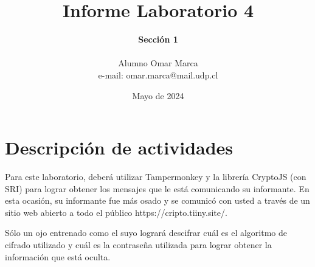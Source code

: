 \documentclass[letter,12pt]{article}
\begin{document}
%
   \title{\Huge{Informe Laboratorio 4}}

   \author{\textbf{Sección 1} \\  \\Alumno Omar Marca \\ e-mail: omar.marca@mail.udp.cl}
          
   \date{Mayo de 2024}

   \maketitle
   
   \tableofcontents
 
  \newpage
  

\section{Descripción de actividades}
Para este laboratorio, deberá utilizar Tampermonkey y la librería CryptoJS (con SRI) para lograr obtener los mensajes que le está comunicando su informante. En esta ocasión, su informante fue más osado y se comunicó con usted a través de un sitio web abierto a todo el público https://cripto.tiiny.site/.\par
Sólo un ojo entrenado como el suyo logrará descifrar cuál es el algoritmo de cifrado utilizado y cuál es la contraseña utilizada para lograr obtener la información que está oculta.
\end{document}
